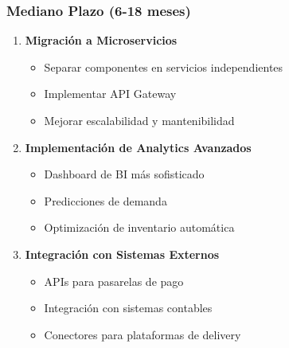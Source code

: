 \documentclass[12pt,a4paper]{article}
\begin{document}
\subsubsection{Mediano Plazo (6-18 meses)}
\begin{enumerate}
    \item \textbf{Migración a Microservicios}
    \begin{itemize}
        \item Separar componentes en servicios independientes
        \item Implementar API Gateway
        \item Mejorar escalabilidad y mantenibilidad
    \end{itemize}
    
    \item \textbf{Implementación de Analytics Avanzados}
    \begin{itemize}
        \item Dashboard de BI más sofisticado
        \item Predicciones de demanda
        \item Optimización de inventario automática
    \end{itemize}
    
    \item \textbf{Integración con Sistemas Externos}
    \begin{itemize}
        \item APIs para pasarelas de pago
        \item Integración con sistemas contables
        \item Conectores para plataformas de delivery
    \end{itemize}
\end{enumerate}
\end{document}
